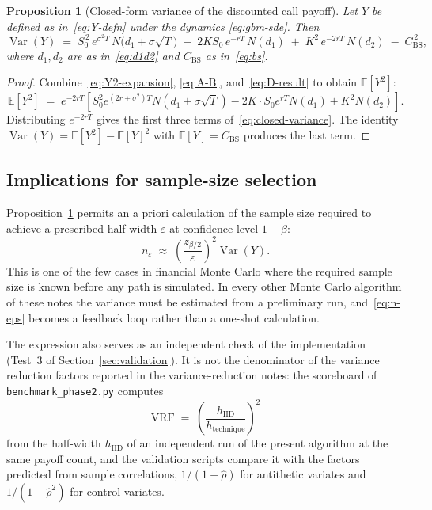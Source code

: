 \documentclass[11pt,a4paper]{article}
\theoremstyle{plain}
\newtheorem{proposition}[theorem]{Proposition}
\theoremstyle{definition}
\theoremstyle{remark}
\newcommand{\E}{\mathbb{E}}
\newcommand{\Var}{\operatorname{Var}}
\begin{document}
\begin{proposition}[Closed-form variance of the discounted call payoff]
\label{prop:closed-form-variance}
Let $Y$ be defined as in~\eqref{eq:Y-defn} under the dynamics
\eqref{eq:gbm-sde}. Then
\begin{equation}
\label{eq:closed-variance}
\Var(Y)
\;=\; S_0^{\,2}\, e^{\sigma^2 T}\, N\!\big(d_1 + \sigma\sqrt{T}\big)
\;-\; 2 K S_0\, e^{-rT}\, N(d_1)
\;+\; K^2\, e^{-2rT}\, N(d_2)
\;-\; C_{\mathrm{BS}}^{\,2},
\end{equation}
where $d_1, d_2$ are as in~\eqref{eq:d1d2} and $C_{\mathrm{BS}}$ as
in~\eqref{eq:bs}.
\end{proposition}

\begin{proof}
Combine~\eqref{eq:Y2-expansion}, \eqref{eq:A-B}, and~\eqref{eq:D-result}
to obtain $\E[Y^2]$:
\[
\E[Y^2] \;=\; e^{-2rT}\!\left[
S_0^2 e^{(2r + \sigma^2)T} N(d_1 + \sigma\sqrt{T})
- 2K \cdot S_0 e^{rT} N(d_1)
+ K^2 N(d_2)
\right].
\]
Distributing $e^{-2rT}$ gives the first three terms
of~\eqref{eq:closed-variance}. The identity
$\Var(Y) = \E[Y^2] - \E[Y]^2$ with $\E[Y] = C_{\mathrm{BS}}$ produces
the last term.
\end{proof}

\subsection{Implications for sample-size selection}

Proposition~\ref{prop:closed-form-variance} permits an a priori
calculation of the sample size required to achieve a prescribed
half-width $\varepsilon$ at confidence level $1-\beta$:
\begin{equation}
\label{eq:n-eps}
n_\varepsilon \;\approx\; \left(\frac{z_{\beta/2}}{\varepsilon}\right)^{\!2}
\Var(Y).
\end{equation}
This is one of the few cases in financial Monte Carlo where the
required sample size is known before any path is simulated. In every
other Monte Carlo algorithm of these notes the variance must be
estimated from a
preliminary run, and~\eqref{eq:n-eps} becomes a feedback loop rather
than a one-shot calculation.

The expression also serves as an independent check of the
implementation (Test~3 of Section~\ref{sec:validation}). It is not the
denominator of the variance reduction factors reported in the
variance-reduction notes: the scoreboard of
\texttt{benchmark\_phase2.py} computes
\[
\mathrm{VRF} \;=\;
\left(\frac{h_{\mathrm{IID}}}{h_{\mathrm{technique}}}\right)^{\!2}
\]
from the half-width $h_{\mathrm{IID}}$ of an independent run of the
present algorithm at the same payoff count, and the validation scripts
compare it with the factors predicted from sample correlations,
$1/(1+\hat\rho)$ for antithetic variates and $1/(1-\hat\rho^2)$ for
control variates.
\end{document}
